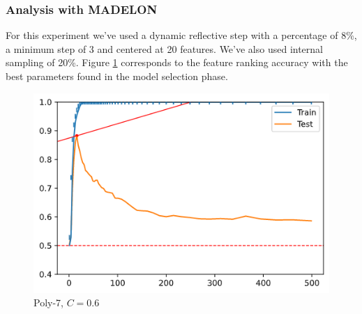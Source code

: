 \begin{table}[H]
    \centering
    \caption{Grid search of SVM-RFE with RBF kernel.}
    \label{fig:ch5.combo.art.tablerbf}
\end{table}

\subsubsection*{Analysis with MADELON}

For this experiment we've used a dynamic reflective step with a percentage of 8\%, a minimum step of 3 and centered at 20 features. We've also used internal sampling of 20\%. Figure \ref{fig:ch5.combo.madelon.one} corresponds to the feature ranking accuracy with the best pa\-ram\-e\-ters found in the model selection phase.  

\begin{figure}[H]
    \centering
    \includegraphics[width=0.4\linewidth]{img/ch5/combo/once.png}
    \caption{Poly-7, $C=0.6$}
    \label{fig:ch5.combo.madelon.one}
\end{figure}

